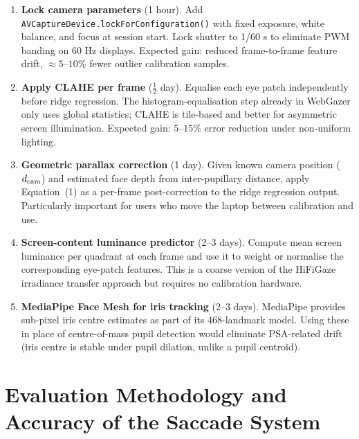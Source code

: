 \documentclass[11pt,a4paper]{article}
\begin{document}
\begin{enumerate}
  \item \textbf{Lock camera parameters} (1 hour).
        Add \texttt{AVCaptureDevice.lockForConfiguration()} with fixed exposure,
        white balance, and focus at session start.
        Lock shutter to 1/60 s to eliminate PWM banding on 60 Hz displays.
        Expected gain: reduced frame-to-frame feature drift, $\approx5$--$10\%$ fewer
        outlier calibration samples.

  \item \textbf{Apply CLAHE per frame} ($\frac{1}{2}$ day).
        Equalise each eye patch independently before ridge regression.
        The histogram-equalisation step already in WebGazer only uses global statistics;
        CLAHE is tile-based and better for asymmetric screen illumination.
        Expected gain: $5$--$15\%$ error reduction under non-uniform lighting.

  \item \textbf{Geometric parallax correction} (1 day).
        Given known camera position ($d_{\rm cam}$) and estimated face depth from
        inter-pupillary distance, apply Equation~(1) as a per-frame post-correction to
        the ridge regression output.
        Particularly important for users who move the laptop between calibration and use.

  \item \textbf{Screen-content luminance predictor} (2--3 days).
        Compute mean screen luminance per quadrant at each frame and use it to weight
        or normalise the corresponding eye-patch features.
        This is a coarse version of the HiFiGaze irradiance transfer approach but
        requires no calibration hardware.

  \item \textbf{MediaPipe Face Mesh for iris tracking} (2--3 days).
        MediaPipe provides sub-pixel iris centre estimates as part of its 468-landmark model.
        Using these in place of centre-of-mass pupil detection would eliminate PSA-related
        drift (iris centre is stable under pupil dilation, unlike a pupil centroid).
\end{enumerate}

\section{Evaluation Methodology and Accuracy of the Saccade System}
\label{sec:evaluation}
\end{document}
